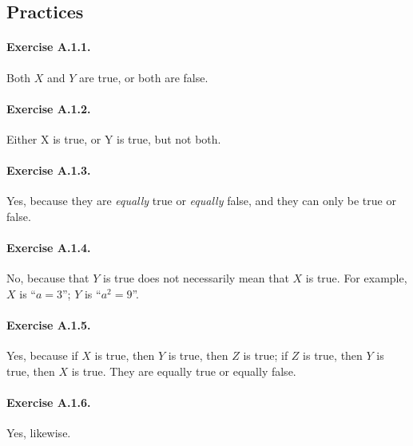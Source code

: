 \subsection{Practices}
\paragraph{Exercise A.1.1.} Both $X$ and $Y$ are true, or both are false.

\paragraph{Exercise A.1.2.} Either X is true, or Y is true, but not both.

\paragraph{Exercise A.1.3.} Yes, because they are \emph{equally} true or \emph{equally} false, and they can only be true or false.

\paragraph{Exercise A.1.4.} No, because that $Y$ is true does not necessarily mean that $X$ is true. For example, $X$ is ``$a=3$''; $Y$ is ``$a^2=9$''.

\paragraph{Exercise A.1.5.} Yes, because if $X$ is true, then $Y$ is true, then $Z$ is true; if $Z$ is true, then $Y$ is true, then $X$ is true. They are equally true or equally false.

\paragraph{Exercise A.1.6.} Yes, likewise.

